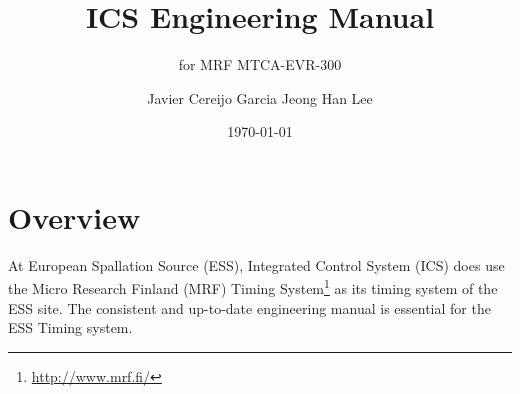 \documentclass[11pt
  , a4paper
  , article
  , oneside
  , showtrims
]{memoir}
\begin{document}


\date{\today}




\title{ICS Engineering Manual}
\subtitle{for MRF MTCA-EVR-300}
\author{Javier Cereijo Garcia \newline Jeong Han Lee }



\showtrimson

\esstitle
\newpage
\tableofcontents
\newpage



\chapter{Overview}
At European Spallation Source (ESS), Integrated Control System (ICS) does use the Micro Research Finland (MRF) Timing System{\footnote{\url{http://www.mrf.fi/}}} as its timing system of the ESS site. The consistent and up-to-date engineering manual is essential for the ESS Timing system.
\end{document}
